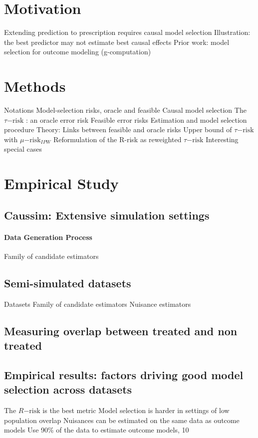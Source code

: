 \documentclass{report}
\begin{document}
\section{Motivation}\label{sec:causal_model_selection:motivation}

Extending prediction to prescription requires causal model selection
Illustration: the best predictor may not estimate best causal effects
Prior work: model selection for outcome modeling (g-computation)
\section{Methods}\label{sec:causal_model_selection:methods}


Notations
Model-selection risks, oracle and feasible
Causal model selection
The $\tau\mathrm{-risk}$ : an oracle error risk
Feasible error risks
Estimation and model selection procedure
Theory: Links between feasible and oracle risks
Upper bound of $\tau\mathrm{-risk}$ with $\mu\mathrm{-risk}_{IPW}$
Reformulation of the R-risk as reweighted $\tau\mathrm{-risk}$
Interesting special cases
\section{Empirical Study}\label{sec:causal_model_selection:empirical_study}

\subsection{Caussim: Extensive simulation settings}\label{subsec:causal_model_selection:caussim}
\paragraph{Data Generation Process}

Family of candidate estimators
\subsection{Semi-simulated datasets}
Datasets
Family of candidate estimators
Nuisance estimators
\subsection{Measuring overlap between treated and non treated}
\subsection{Empirical results: factors driving good model selection across datasets}
The $R\mathrm{-risk}$ is the best metric
Model selection is harder in settings of low population overlap
Nuisances can be estimated on the same data as outcome models
Use 90\% of the data to estimate outcome models, 10%
\end{document}
